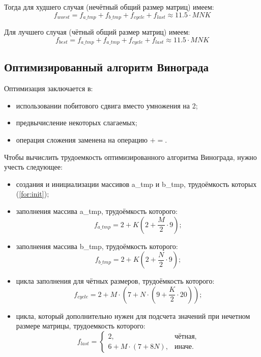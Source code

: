 Тогда для худшего случая (нечётный общий размер матриц) имеем:
\begin{equation}
	\label{for:bad}
	f_{worst} =  f_{a\_tmp} + f_{b\_tmp} + f_{cycle} + f_{last}\approx 11.5 \cdot MNK
\end{equation}

Для лучшего случая (чётный общий размер матриц) имеем:
\begin{equation}
	\label{for:good}
f_{best} =  f_{a\_tmp} + f_{a\_tmp} + f_{cycle} + f_{last} \approx 11.5 \cdot MNK
\end{equation}


\subsection{Оптимизированный алгоритм Винограда}

Оптимизация заключается в:
\begin{itemize}
    \item использовании побитового сдвига вместо умножения на 2;
    \item предвычисление некоторых слагаемых;
    \item операция сложения заменена на операцию $+=$. \newline
\end{itemize}

Чтобы вычислить трудоемкость оптимизированного алгоритма Винограда, нужно учесть следующее: 

\begin{itemize}
	\item создания и инициализации массивов a\_tmp и b\_tmp, трудоёмкость которых (\ref{for:init});

	\item заполнения массива a\_tmp, трудоёмкость которого:
	\begin{equation}
		\label{for:ATMP_impr}
		f_{a\_tmp} = 2 + K (2 + \frac{M}{2} \cdot 9);
	\end{equation}

	\item заполнения массива b\_tmp, трудоёмкость которого:
	\begin{equation}
		\label{for:BTMP_impr}
		f_{b\_tmp} = 2 + K (2 + \frac{N}{2} \cdot 9);
	\end{equation}

	\item цикла заполнения для чётных размеров, трудоёмкость которого:
	\begin{equation}
		\label{for:cycle_impr}
		f_{cycle} = 2 + M \cdot (7 + N \cdot (9 + \frac{K}{2} \cdot 20));
	\end{equation}
	
	\item цикла, который дополнительно нужен для подсчета значений при нечетном размере матрицы, трудоемкость которого:
	\begin{equation}
		\label{for:last_impr}
		f_{last} = \begin{cases}
			2, & \text{чётная,}\\
			6 + M \cdot (7 + 8N), & \text{иначе.}
		\end{cases}
	\end{equation}
\end{itemize}

